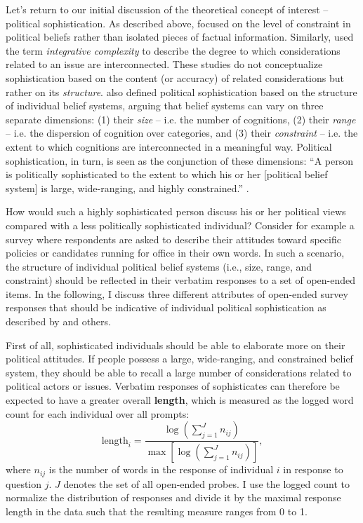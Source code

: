 \documentclass[12pt]{article}
\begin{document}
Let's return to our initial discussion of the theoretical concept of interest -- political sophistication. As described above, \citet{converse1964nature} focused on the level of constraint in political beliefs rather than isolated pieces of factual information. Similarly, \citet{tetlock1983cognitive} used the term \textsl{integrative complexity} to describe the degree to which considerations related to an issue are interconnected. These studies do not conceptualize sophistication based on the content (or accuracy) of related considerations but rather on its \textsl{structure}. \citet{luskin1987measuring} also defined political sophistication based on the structure of individual belief systems, arguing that belief systems can vary on three separate dimensions: (1) their \textsl{size} -- i.e. the number of cognitions, (2) their \textsl{range} -- i.e. the dispersion of cognition over categories, and (3) their \textsl{constraint} -- i.e. the extent to which cognitions are interconnected in a meaningful way. Political sophistication, in turn, is seen as the conjunction of these dimensions: ``A person is politically sophisticated to the extent to which his or her [political belief system] is large, wide-ranging, and highly constrained.'' \citep[860]{luskin1987measuring}.

How would such a highly sophisticated person discuss his or her political views compared with a less politically sophisticated individual? Consider for example a survey where respondents are asked to describe their attitudes toward specific policies or candidates running for office in their own words. In such a scenario, the structure of individual political belief systems (i.e., size, range, and constraint) should be reflected in their verbatim responses to a set of open-ended items. In the following, I discuss three different attributes of open-ended survey responses that should be indicative of individual political sophistication as described by \citet{luskin1987measuring} and others.

First of all, sophisticated individuals should be able to elaborate more on their political attitudes. If people possess a large, wide-ranging, and constrained belief system, they should be able to recall a large number of considerations related to political actors or issues. Verbatim responses of sophisticates can therefore be expected to have a greater overall \textbf{length}, which is measured as the logged word count for each individual over all prompts:
\begin{equation}
\text{length}_i = \dfrac{\log\left(\sum_{j=1}^J n_{ij}\right)}{\max\left[\log\left(\sum_{j=1}^J n_{ij}\right)\right]},
\end{equation}
where $n_{ij}$ is the number of words in the response of individual $i$ in response to question $j$. $J$ denotes the set of all open-ended probes. I use the logged count to normalize the distribution of responses and divide it by the maximal response length in the data such that the resulting measure ranges from 0 to 1.
\end{document}
